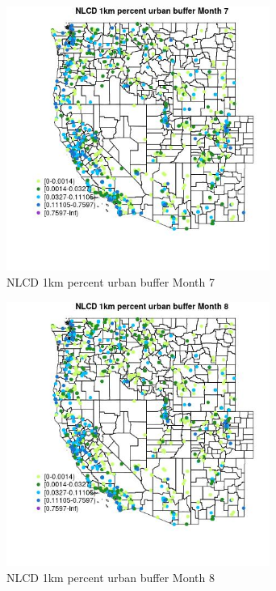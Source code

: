 \begin{figure} 
\centering  
\includegraphics[width=0.77\textwidth]{Code_Outputs/Report_ML_input_PM25_Step4_part_e_de_duplicated_aves_compiled_2019-05-21wNAs_MapObsMo7NLCD_1km_percent_urban_buffer.jpg} 
\caption{\label{fig:Report_ML_input_PM25_Step4_part_e_de_duplicated_aves_compiled_2019-05-21wNAsMapObsMo7NLCD_1km_percent_urban_buffer}NLCD 1km percent urban buffer Month 7} 
\end{figure} 
 

\begin{figure} 
\centering  
\includegraphics[width=0.77\textwidth]{Code_Outputs/Report_ML_input_PM25_Step4_part_e_de_duplicated_aves_compiled_2019-05-21wNAs_MapObsMo8NLCD_1km_percent_urban_buffer.jpg} 
\caption{\label{fig:Report_ML_input_PM25_Step4_part_e_de_duplicated_aves_compiled_2019-05-21wNAsMapObsMo8NLCD_1km_percent_urban_buffer}NLCD 1km percent urban buffer Month 8} 
\end{figure} 
 

